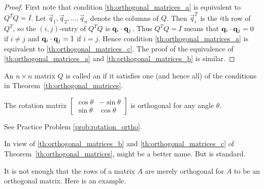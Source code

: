 \documentclass{ximera}
\begin{document}
\begin{proof}
First note that condition \ref{th:orthogonal_matrices_a} is equivalent to $Q^{T}Q = I$. Let $\vec{q}_{1}, \vec{q}_{2}, \dots, \vec{q}_{n}$ denote the columns of $Q$. Then $\vec{q}_{i}^{T}$ is the $i$th row of $Q^{T}$, so the $(i, j)$-entry of $Q^{T}Q$ is $\mathbf{q}_{i} \cdot \mathbf{q}_{j}$. Thus $Q^{T}Q = I$ means that $\mathbf{q}_{i} \cdot \mathbf{q}_{j} = 0$ if $i \neq j$ and $\mathbf{q}_{i} \cdot \mathbf{q}_{j} = 1$ if $i = j$. Hence condition \ref{th:orthogonal_matrices_a} is equivalent to \ref{th:orthogonal_matrices_c}. The proof of the equivalence of \ref{th:orthogonal_matrices_a} and \ref{th:orthogonal_matrices_b} is similar.
\end{proof}

\begin{definition}\label{def:orthogonal matrices}
An $n \times n$ matrix $Q$ is called an  if it satisfies one (and hence all) of the conditions in Theorem~\ref{th:orthogonal_matrices}.
\end{definition}


\begin{example}\label{ex:rotation_ortho}
The rotation matrix
$\begin{bmatrix}
\cos\theta & -\sin\theta \\
\sin\theta & \cos\theta
\end{bmatrix}$ is orthogonal for any angle $\theta$.
\begin{explanation}
See Practice Problem \ref{prob:rotation_ortho}.
\end{explanation}
\end{example}

\begin{remark}\label{rem:orthVsOrthnormMat}
In view of \ref{th:orthogonal_matrices_b} and \ref{th:orthogonal_matrices_c} of Theorem~\ref{th:orthogonal_matrices},  might be a better name. But  is standard.
\end{remark}

It is not enough that the rows of a matrix $A$ are merely orthogonal for $A$ to be an orthogonal matrix. Here is an example.
    
\end{document}
